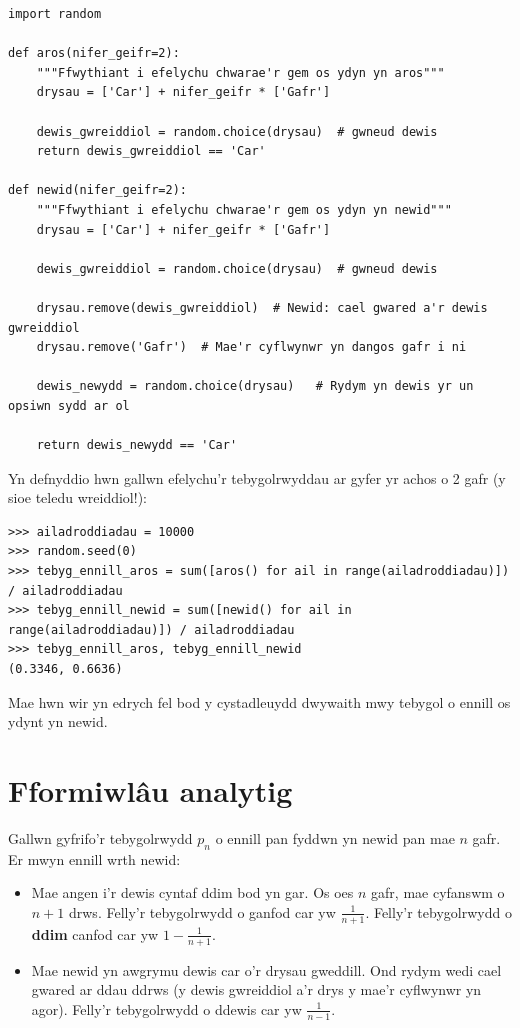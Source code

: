 \documentclass[a4paper]{article}
\begin{document}
\begin{verbatim}
import random

def aros(nifer_geifr=2):
    """Ffwythiant i efelychu chwarae'r gem os ydyn yn aros"""
    drysau = ['Car'] + nifer_geifr * ['Gafr']
        
    dewis_gwreiddiol = random.choice(drysau)  # gwneud dewis
    return dewis_gwreiddiol == 'Car'

def newid(nifer_geifr=2):
    """Ffwythiant i efelychu chwarae'r gem os ydyn yn newid"""
    drysau = ['Car'] + nifer_geifr * ['Gafr']
    
    dewis_gwreiddiol = random.choice(drysau)  # gwneud dewis
    
    drysau.remove(dewis_gwreiddiol)  # Newid: cael gwared a'r dewis gwreiddiol
    drysau.remove('Gafr')  # Mae'r cyflwynwr yn dangos gafr i ni
    
    dewis_newydd = random.choice(drysau)   # Rydym yn dewis yr un opsiwn sydd ar ol
            
    return dewis_newydd == 'Car'
\end{verbatim}

Yn defnyddio hwn gallwn efelychu'r tebygolrwyddau ar gyfer yr achos o 2 gafr (y
sioe teledu wreiddiol!):

\begin{verbatim}
>>> ailadroddiadau = 10000
>>> random.seed(0)
>>> tebyg_ennill_aros = sum([aros() for ail in range(ailadroddiadau)]) / ailadroddiadau
>>> tebyg_ennill_newid = sum([newid() for ail in range(ailadroddiadau)]) / ailadroddiadau
>>> tebyg_ennill_aros, tebyg_ennill_newid
(0.3346, 0.6636)
\end{verbatim}

Mae hwn wir yn edrych fel bod y cystadleuydd dwywaith mwy tebygol o ennill os
ydynt yn newid.


\section{Fformiwl\^{a}u analytig}\label{sec:analytical_formulae}

Gallwn gyfrifo'r tebygolrwydd \(p_n\) o ennill pan fyddwn yn newid pan mae \(n\)
gafr. Er mwyn ennill wrth newid:

\begin{itemize}
    \item Mae angen i'r dewis cyntaf ddim bod yn gar. Os oes \(n\) gafr, mae
        cyfanswm o \(n + 1\) drws. Felly'r tebygolrwydd o ganfod car yw
        \(\frac{1}{n + 1}\). Felly'r tebygolrwydd o \textbf{ddim} canfod car yw
        \(1 - \frac{1}{n + 1}\).
    \item Mae newid yn awgrymu dewis car o'r drysau gweddill. Ond rydym wedi
        cael gwared ar ddau ddrws (y dewis gwreiddiol a'r drys y mae'r cyflwynwr
        yn agor). Felly'r tebygolrwydd o ddewis car yw \(\frac{1}{n - 1}\).
\end{itemize}
\end{document}
